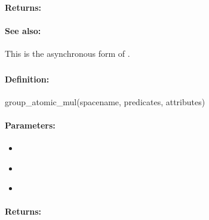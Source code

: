 \paragraph{Returns:}


\paragraph{See also:}  This is the asynchronous form of .

\pagebreak
\subsubsection{}
\label{api:ruby:group_atomic_mul}


\paragraph{Definition:}
\begin{rubycode}
group_atomic_mul(spacename, predicates, attributes)
\end{rubycode}

\paragraph{Parameters:}
\begin{itemize}[noitemsep]
\item {}\\

\item {}\\

\item {}\\

\end{itemize}

\paragraph{Returns:}


\pagebreak
\subsubsection{}
\label{api:ruby:async_group_atomic_mul}



